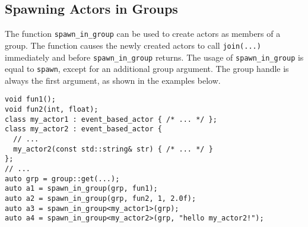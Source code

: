 \clearpage
\subsection{Spawning Actors in Groups}
\label{Sec::Group::Spawn}

The function \lstinline^spawn_in_group^ can be used to create actors as members of a group.
The function causes the newly created actors to call \lstinline^join(...)^ immediately and before \lstinline^spawn_in_group^ returns. 
The usage of \lstinline^spawn_in_group^ is equal to \lstinline^spawn^, except for an additional group argument.
The group handle is always the first argument, as shown in the examples below.

\begin{lstlisting}
void fun1();
void fun2(int, float);
class my_actor1 : event_based_actor { /* ... */ };
class my_actor2 : event_based_actor {
  // ...
  my_actor2(const std::string& str) { /* ... */ }
};
// ...
auto grp = group::get(...);
auto a1 = spawn_in_group(grp, fun1);
auto a2 = spawn_in_group(grp, fun2, 1, 2.0f);
auto a3 = spawn_in_group<my_actor1>(grp);
auto a4 = spawn_in_group<my_actor2>(grp, "hello my_actor2!");
\end{lstlisting}
